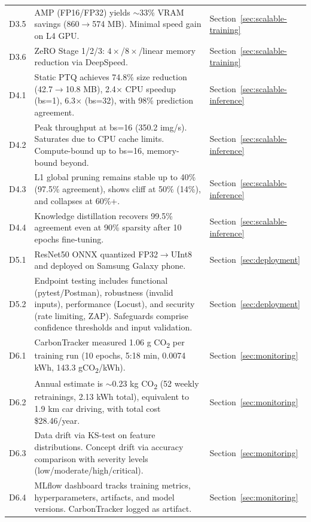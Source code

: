 \begin{table}[t]
\begin{tabularx}{\textwidth}{@{} l X l @{}}
        D3.5  & AMP (FP16/FP32) yields $\sim$33\% VRAM savings (860$\to$574 MB). Minimal speed gain on L4 GPU. & Section~\ref{sec:scalable-training} \\
        D3.6  & ZeRO Stage 1/2/3: $4\times$/$8\times$/linear memory reduction via DeepSpeed. & Section~\ref{sec:scalable-training} \\
        D4.1  & Static PTQ achieves 74.8\% size reduction (42.7$\to$10.8 MB), 2.4$\times$ CPU speedup (bs=1), 6.3$\times$ (bs=32), with 98\% prediction agreement. & Section~\ref{sec:scalable-inference} \\
        D4.2  & Peak throughput at bs=16 (350.2 img/s). Saturates due to CPU cache limits. Compute-bound up to bs=16, memory-bound beyond. & Section~\ref{sec:scalable-inference} \\
        D4.3  & L1 global pruning remains stable up to 40\% (97.5\% agreement), shows cliff at 50\% (14\%), and collapses at 60\%+. & Section~\ref{sec:scalable-inference} \\
        D4.4  & Knowledge distillation recovers 99.5\% agreement even at 90\% sparsity after 10 epochs fine-tuning. & Section~\ref{sec:scalable-inference} \\
        D5.1  & ResNet50 ONNX quantized FP32$\to$UInt8 and deployed on Samsung Galaxy phone. & Section~\ref{sec:deployment} \\
        D5.2  & Endpoint testing includes functional (pytest/Postman), robustness (invalid inputs), performance (Locust), and security (rate limiting, ZAP). Safeguards comprise confidence thresholds and input validation. & Section~\ref{sec:deployment} \\
        D6.1  & CarbonTracker measured 1.06 g CO\textsubscript{2} per training run (10 epochs, 5:18 min, 0.0074 kWh, 143.3 gCO\textsubscript{2}/kWh). & Section~\ref{sec:monitoring} \\
        D6.2  & Annual estimate is $\sim$0.23 kg CO\textsubscript{2} (52 weekly retrainings, 2.13 kWh total), equivalent to 1.9 km car driving, with total cost \$28.46/year. & Section~\ref{sec:monitoring} \\
        D6.3  & Data drift via KS-test on feature distributions. Concept drift via accuracy comparison with severity levels (low/moderate/high/critical). & Section~\ref{sec:monitoring} \\
        D6.4  & MLflow dashboard tracks training metrics, hyperparameters, artifacts, and model versions. CarbonTracker logged as artifact. & Section~\ref{sec:monitoring} \\

\end{tabularx}
\end{table}
